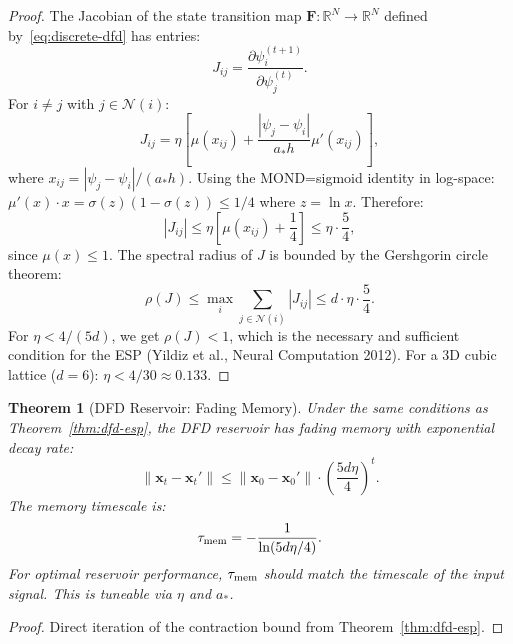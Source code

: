 \documentclass[11pt]{article}
\newtheorem{theorem}{Theorem}[section]
\theoremstyle{definition}
\theoremstyle{remark}
\begin{document}
\begin{proof}
The Jacobian of the state transition map $\mathbf{F}: \mathbb{R}^N \to \mathbb{R}^N$
defined by~\eqref{eq:discrete-dfd} has entries:
\begin{equation}
  J_{ij} = \frac{\partial \psi_i^{(t+1)}}{\partial \psi_j^{(t)}}.
\end{equation}
For $i \neq j$ with $j \in \mathcal{N}(i)$:
\begin{equation}
  J_{ij} = \eta\left[\mu(x_{ij}) + \frac{|\psi_j - \psi_i|}{a_* h}\mu'(x_{ij})\right],
\end{equation}
where $x_{ij} = |\psi_j - \psi_i|/(a_* h)$. Using the MOND=sigmoid identity
in log-space: $\mu'(x) \cdot x = \sigma(z)(1-\sigma(z)) \leq 1/4$ where
$z = \ln x$. Therefore:
\begin{equation}
  |J_{ij}| \leq \eta\left[\mu(x_{ij}) + \frac{1}{4}\right] \leq \eta \cdot \frac{5}{4},
\end{equation}
since $\mu(x) \leq 1$. The spectral radius of $J$ is bounded by the
Gershgorin circle theorem:
\begin{equation}
  \rho(J) \leq \max_i \sum_{j \in \mathcal{N}(i)} |J_{ij}|
  \leq d \cdot \eta \cdot \frac{5}{4}.
\end{equation}
For $\eta < 4/(5d)$, we get $\rho(J) < 1$, which is the necessary and
sufficient condition for the ESP (Yildiz et al., Neural Computation 2012).
For a 3D cubic lattice ($d = 6$): $\eta < 4/30 \approx 0.133$.
\end{proof}

\begin{theorem}[DFD Reservoir: Fading Memory]
\label{thm:dfd-fading-memory}
Under the same conditions as Theorem~\ref{thm:dfd-esp}, the DFD reservoir
has fading memory with exponential decay rate:
\begin{equation}
  \|\mathbf{x}_t - \mathbf{x}_t'\| \leq \|\mathbf{x}_0 - \mathbf{x}_0'\|
  \cdot \left(\frac{5d\eta}{4}\right)^t.
  \label{eq:fading-memory}
\end{equation}
The memory timescale is:
\begin{equation}
  \tau_{\rm mem} = -\frac{1}{\ln(5d\eta/4)}.
  \label{eq:memory-timescale}
\end{equation}
For optimal reservoir performance, $\tau_{\rm mem}$ should match the
timescale of the input signal. This is tuneable via $\eta$ and $a_*$.
\end{theorem}

\begin{proof}
Direct iteration of the contraction bound from Theorem~\ref{thm:dfd-esp}.
\end{proof}
\end{document}
